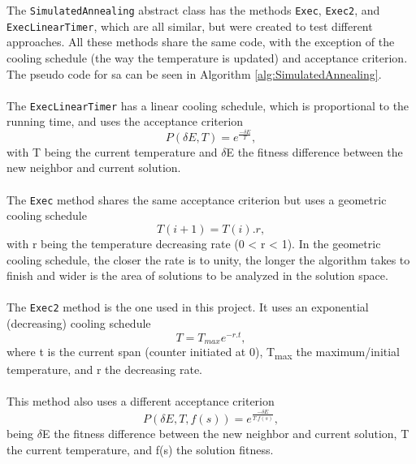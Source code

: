 The \verb+SimulatedAnnealing+ abstract class has the methods \verb+Exec+, \verb+Exec2+, and \verb+ExecLinearTimer+, which are all similar, but were created to test different approaches. All these methods share the same code, with the exception of the cooling schedule (the way the temperature is updated) and acceptance criterion. The pseudo code for \gls{sa} can be seen in Algorithm \ref{alg:SimulatedAnnealing}.\\
\\
The \verb+ExecLinearTimer+ has a linear cooling schedule, which is proportional to the running time, and uses the acceptance criterion
\begin{equation}
P(\delta E, T) = e^{\frac{-\delta E}{T}},
\end{equation} with T being the current temperature and $\delta$E the fitness difference between the new neighbor and current solution.\\
\\
The \verb+Exec+ method shares the same acceptance criterion but uses a geometric cooling schedule \begin{equation}
T (i+1) = T(i).r,
\end{equation}with r being the temperature decreasing rate (0 < r < 1). In the geometric cooling schedule, the closer the rate is to unity, the longer the algorithm takes to finish and wider is the area of solutions to be analyzed in the solution space.\\
\\
The \verb+Exec2+ method is the one used in this project. It uses an exponential (decreasing) cooling schedule \cite{CarvalhoLisbonNovember2004}\\
\begin{equation} 
T = T_{max}e^{-r.t},
\end{equation}
where t is the current span (counter initiated at 0), T\textsubscript{max} the maximum/initial temperature, and r the decreasing rate.\\
\\
This method also uses a different acceptance criterion \begin{equation} P(\delta E, T, f(s)) = e^{\frac{-\delta E}{T.f(s)}},
\end{equation}
being $\delta$E the fitness difference between the new neighbor and current solution, T the current temperature, and f(s) the solution fitness.
\\
